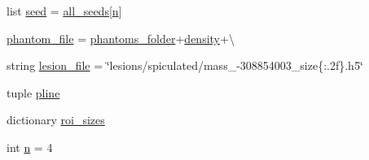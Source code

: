 \begin{DoxyCompactItemize}
\item 
list \hyperlink{namespacerun__pipeline__lesionsizes_ae359043ae5c4f2c1d8f12c0cdbffb932}{seed} = \hyperlink{namespacerun__pipeline__lesionsizes_a17e351f66c99883c1fc46e398ddb89db}{all\-\_\-seeds}\mbox{[}\hyperlink{namespacerun__pipeline__lesionsizes_a8e812d3e5e9a02e87801a5fcdd32c268}{n}\mbox{]}
\item 
\hyperlink{namespacerun__pipeline__lesionsizes_aa31734859d313f521c7643f1db6be86c}{phantom\-\_\-file} = \hyperlink{namespacerun__pipeline__lesionsizes_a121e580b0ae55595847533bd0f4c9250}{phantoms\-\_\-folder}+\hyperlink{namespacerun__pipeline__lesionsizes_ae2a3f1b39ec7dc28c3aa3bc223432ba8}{density}+\textbackslash{}
\item 
string \hyperlink{namespacerun__pipeline__lesionsizes_a6036549ef880af11d13c9e0c5d2c001a}{lesion\-\_\-file} = \char`\"{}lesions/spiculated/mass\-\_\--\/308854003\-\_\-size\{\-:.\-2f\}.\-h5\char`\"{}
\item 
tuple \hyperlink{namespacerun__pipeline__lesionsizes_ac13a2bd6cea7d4d8155376ddaf1ba751}{pline}
\item 
dictionary \hyperlink{namespacerun__pipeline__lesionsizes_a3b75350f1aa1a1b47aa8ef34a06809db}{roi\-\_\-sizes}
\item 
int \hyperlink{namespacerun__pipeline__lesionsizes_a8e812d3e5e9a02e87801a5fcdd32c268}{n} = 4
\end{DoxyCompactItemize}


